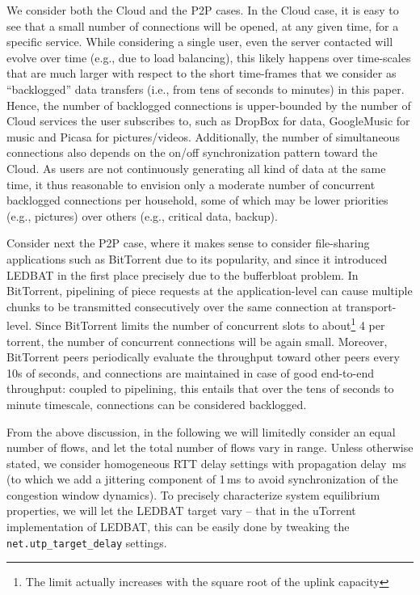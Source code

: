 \documentclass[conference]{IEEEtran}
\begin{document}
We consider both the Cloud and the P2P cases. In the Cloud case, it is easy to see that a small number of connections will be opened, at any given time, for a specific service. While considering a single user, even the server contacted will evolve over time (e.g., due to load balancing), this likely happens over time-scales that are much larger with respect to the short time-frames that we consider as ``backlogged'' data transfers (i.e., from tens of seconds to minutes) in this paper. Hence, the number of backlogged connections is upper-bounded by the number of Cloud services the user subscribes to, such as DropBox for  data, GoogleMusic for music and Picasa for pictures/videos. Additionally, the number of simultaneous connections also depends on the on/off synchronization pattern toward the Cloud. As users are not continuously generating all kind of data at the same time, it thus reasonable to envision only a moderate number of concurrent backlogged connections per household, some of which may be lower priorities (e.g., pictures) over others (e.g., critical data, backup).

Consider next the P2P case, where it makes sense to consider file-sharing applications such as BitTorrent due to its popularity, and since it introduced LEDBAT in the first place precisely due to the bufferbloat problem.
In BitTorrent, pipelining of piece requests at the application-level can cause multiple chunks to be transmitted consecutively over the same connection at transport-level. Since BitTorrent limits the number of concurrent slots to about\footnote{The limit actually increases with the square root of the uplink capacity} 4 per torrent, the number of concurrent connections will be again small. Moreover, BitTorrent peers periodically evaluate the throughput toward other peers every 10s of seconds, and connections are maintained in case of good end-to-end throughput: coupled to pipelining, this entails that over the tens of seconds to minute timescale, connections can be considered backlogged.

From the above discussion, in the following we will limitedly consider an equal number  of flows, and let the total number of flows vary in   range. Unless otherwise stated, we consider homogeneous RTT delay settings with propagation delay \,ms (to which we add a jittering component of 1\,ms to avoid synchronization of the congestion window dynamics).
To precisely characterize system equilibrium properties, we will let 
the LEDBAT target  vary -- that in the uTorrent implementation of LEDBAT, this can be easily done by tweaking the {\texttt{net.utp\_target\_delay}} settings.
\end{document}
